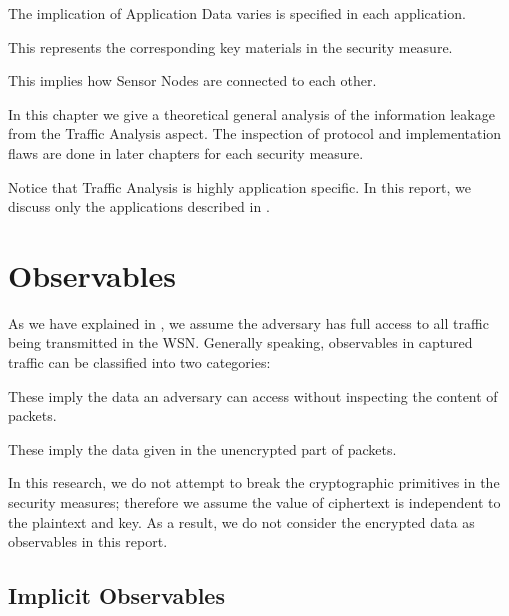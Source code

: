 \begin{description}[style=nextline]
	\item[Content and Size of Application Data]
	The implication of Application Data varies is specified in each application.
	
	\item[Cryptographic Key]
	This represents the corresponding key materials in the security measure.
	
	\item[Network Topology]
	This implies how Sensor Nodes are connected to each other.
	
\end{description}

In this chapter we give a theoretical general analysis of the information leakage from the Traffic Analysis aspect. The inspection of protocol and implementation flaws are done in later chapters for each security measure.

Notice that Traffic Analysis is highly application specific. In this report, we discuss only the applications described in . 

\section{Observables} \label{Sec: Observables}

As we have explained in , we assume the adversary has full access to all traffic being transmitted in the WSN. Generally speaking, observables in captured traffic can be classified into two categories:
\begin{description}[style=nextline]
	\item[Implicit observables]
	 These imply the data an adversary can access without inspecting the content of packets.
	\item[Explicit observables]
	 These imply the data given in the unencrypted part of packets.
\end{description}

In this research, we do not attempt to break the cryptographic primitives in the security measures; therefore we assume the value of ciphertext is independent to the plaintext and key. As a result, we do not consider the encrypted data as observables in this report.

\subsection{Implicit Observables} \label{Subsec: Implicit Observables}

